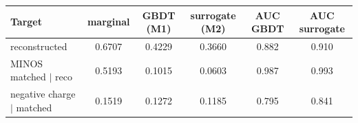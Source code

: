 \begin{tabular}{lccccc}
\toprule
Target & marginal & GBDT (M1) & surrogate (M2) & AUC GBDT & AUC surrogate \\
\midrule
reconstructed & 0.6707 & 0.4229 & 0.3660 & 0.882 & 0.910 \\
MINOS matched $\mid$ reco & 0.5193 & 0.1015 & 0.0603 & 0.987 & 0.993 \\
negative charge $\mid$ matched & 0.1519 & 0.1272 & 0.1185 & 0.795 & 0.841 \\
\bottomrule
\end{tabular}
